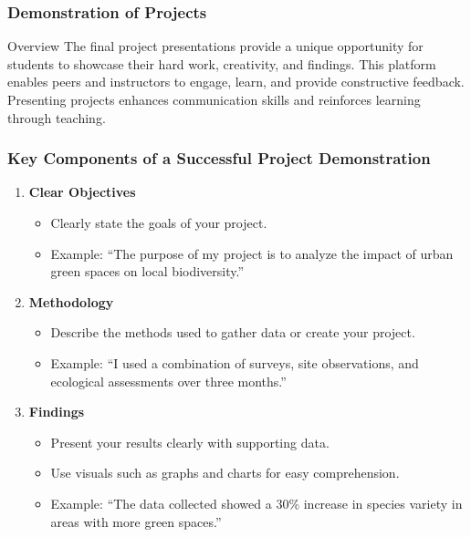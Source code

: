 \documentclass[aspectratio=169]{beamer}
\begin{document}
\begin{frame}[fragile]
    \frametitle{Demonstration of Projects}
    \begin{block}{Overview}
        The final project presentations provide a unique opportunity for students to showcase their hard work, creativity, and findings. This platform enables peers and instructors to engage, learn, and provide constructive feedback. Presenting projects enhances communication skills and reinforces learning through teaching.
    \end{block}
\end{frame}

\begin{frame}[fragile]
    \frametitle{Key Components of a Successful Project Demonstration}
    \begin{enumerate}
        \item \textbf{Clear Objectives}
        \begin{itemize}
            \item Clearly state the goals of your project.
            \item Example: ``The purpose of my project is to analyze the impact of urban green spaces on local biodiversity.''
        \end{itemize}

        \item \textbf{Methodology}
        \begin{itemize}
            \item Describe the methods used to gather data or create your project.
            \item Example: ``I used a combination of surveys, site observations, and ecological assessments over three months.''
        \end{itemize}

        \item \textbf{Findings}
        \begin{itemize}
            \item Present your results clearly with supporting data.
            \item Use visuals such as graphs and charts for easy comprehension.
            \item Example: ``The data collected showed a 30\% increase in species variety in areas with more green spaces.''
        \end{itemize}
    \end{enumerate}
\end{frame}
\end{document}
